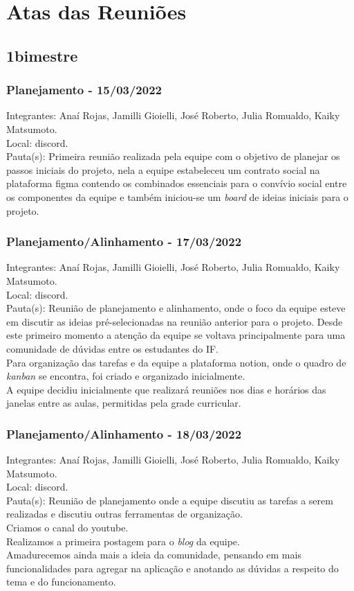 \chapter{Atas das Reuniões}

\label{atasReunioes}
\section{1\textordmasculine bimestre}
\subsection{Planejamento - 15/03/2022}
\noindent Integrantes: Anaí Rojas, Jamilli Gioielli, José Roberto, Julia Romualdo, Kaiky Matsumoto. \\
Local: \gls{discord}. \\
Pauta(s): Primeira reunião realizada pela equipe com o objetivo de planejar os passos iniciais do projeto, nela a equipe estabeleceu um contrato social na plataforma \gls{figma} contendo os combinados essenciais para o convívio social entre os componentes da equipe e também iniciou-se um \textsl{board} de ideias iniciais para o projeto.

\subsection{Planejamento/Alinhamento - 17/03/2022}
\noindent Integrantes: Anaí Rojas, Jamilli Gioielli, José Roberto, Julia Romualdo, Kaiky Matsumoto. \\
Local: \gls{discord}.\\
Pauta(s): Reunião de planejamento e alinhamento, onde o foco da equipe esteve em discutir as ideias pré-selecionadas na reunião anterior para o projeto. Desde este primeiro momento a atenção da equipe se voltava principalmente para uma comunidade de dúvidas entre os estudantes do IF. \\
Para organização das tarefas e da equipe a plataforma \gls{notion}, onde o quadro de \textsl{kanban} se encontra, foi criado e organizado inicialmente. \\
A equipe decidiu inicialmente que realizará reuniões nos dias e horários das janelas entre as aulas, permitidas pela grade curricular.

\subsection{Planejamento/Alinhamento - 18/03/2022}
\noindent Integrantes: Anaí Rojas, Jamilli Gioielli, José Roberto, Julia Romualdo, Kaiky Matsumoto. \\
Local: \gls{discord}.\\
Pauta(s): Reunião de planejamento onde a equipe discutiu as tarefas a serem realizadas e discutiu outras ferramentas de organização. \\
Criamos o canal do \gls{youtube}.\\
Realizamos a primeira postagem para o \textsl{blog} da equipe.\\
Amadurecemos ainda mais a ideia da comunidade, pensando em mais funcionalidades para agregar na aplicação e anotando as dúvidas a respeito do tema e do funcionamento.

